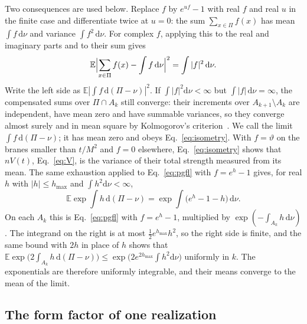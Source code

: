 \documentclass[a4paper,11pt]{article}
\newcommand{\bE}{\mathbb{E}}
\newcommand{\dd}{\mathrm{d}}
\begin{document}
Two consequences are used below. Replace $f$ by $e^{uf}-1$ with real $f$ and real $u$ in the finite case and differentiate twice at $u=0$: the sum $\sum_{x\in\Pi}f(x)$ has mean $\int f\,\dd\nu$ and variance $\int f^2\,\dd\nu$. For complex $f$, applying this to the real and imaginary parts and to their sum gives
\begin{equation}
\label{eq:isometry}
\bE\Bigl|\sum_{x\in\Pi}f(x)-\int f\,\dd\nu\Bigr|^2=\int|f|^2\,\dd\nu .
\end{equation}
Write the left side as $\bE|\int f\,\dd(\Pi-\nu)|^2$. If $\int|f|^2\dd\nu<\infty$ but $\int|f|\,\dd\nu=\infty$, the compensated sums over $\Pi\cap A_k$ still converge: their increments over $A_{k+1}\setminus A_k$ are independent, have mean zero and have summable variances, so they converge almost surely and in mean square by Kolmogorov's criterion~\cite{Feller1971}. We call the limit $\int f\,\dd(\Pi-\nu)$; it has mean zero and obeys Eq.~\eqref{eq:isometry}. With $f=\vartheta$ on the branes smaller than $t/M^2$ and $f=0$ elsewhere, Eq.~\eqref{eq:isometry} shows that $nV(t)$, Eq.~\eqref{eq:V}, is the variance of their total strength measured from its mean. The same exhaustion applied to Eq.~\eqref{eq:pgfl} with $f=e^{h}-1$ gives, for real $h$ with $|h|\le h_{\max}$ and $\int h^2\dd\nu<\infty$,
\begin{equation}
\label{eq:expmoment}
\bE\exp\int h\,\dd(\Pi-\nu)=\exp\int\bigl(e^{h}-1-h\bigr)\,\dd\nu .
\end{equation}
On each $A_k$ this is Eq.~\eqref{eq:pgfl} with $f=e^h-1$, multiplied by $\exp(-\int_{A_k}h\,\dd\nu)$. The integrand on the right is at most $\frac12e^{h_{\max}}h^2$, so the right side is finite, and the same bound with $2h$ in place of $h$ shows that $\bE\exp\bigl(2\int_{A_k}h\,\dd(\Pi-\nu)\bigr)\le\exp\bigl(2e^{2h_{\max}}\int h^2\dd\nu\bigr)$ uniformly in $k$. The exponentials are therefore uniformly integrable, and their means converge to the mean of the limit.

\subsection{The form factor of one realization}
\label{sec:formfactor}
\end{document}
